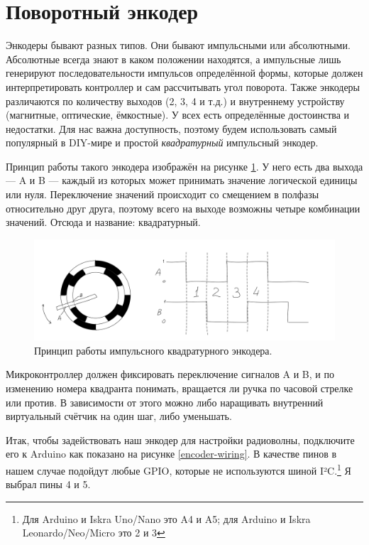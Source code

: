 \section{Поворотный энкодер}

Энкодеры бывают разных типов. Они бывают импульсными или абсолютными. Абсолютные всегда знают в каком положении находятся, а импульсные лишь генерируют последовательности импульсов определённой формы, которые должен интерпретировать контроллер и сам рассчитывать угол поворота. Также энкодеры различаются по количеству выходов (2, 3, 4 и т.д.) и внутреннему устройству (магнитные, оптические, ёмкостные). У всех есть определённые достоинства и недостатки. Для нас важна доступность, поэтому будем использовать самый популярный в DIY-мире и простой \emph{квадратурный} импульсный энкодер.

Принцип работы такого энкодера изображён на рисунке \ref{fig:quadrature-encoder}. У него есть два выхода — A и B — каждый из которых может принимать значение логической единицы или нуля. Переключение значений происходит со смещением в полфазы относительно друг друга, поэтому всего на выходе возможны четыре комбинации значений. Отсюда и название: квадратурный.

\begin{figure}
  \centering
  \includegraphics{sketches/quadrature-encoder-internals}
  \caption{Принцип работы импульсного квадратурного энкодера.}
  \label{fig:quadrature-encoder}
\end{figure}

Микроконтроллер должен фиксировать переключение сигналов A и B, и по изменению номера квадранта понимать, вращается ли ручка по часовой стрелке или против. В зависимости от этого можно либо наращивать внутренний виртуальный счётчик на один шаг, либо уменьшать.

Итак, чтобы задействовать наш энкодер для настройки радиоволны, подключите его к Arduino как показано на рисунке \ref{encoder-wiring}. В качестве пинов в нашем случае подойдут любые GPIO, которые не используются шиной I²C.\footnote{Для Arduino и Iskra Uno/Nano это A4 и A5; для Arduino и Iskra Leonardo/Neo/Micro это 2 и 3} Я выбрал пины 4 и 5.

